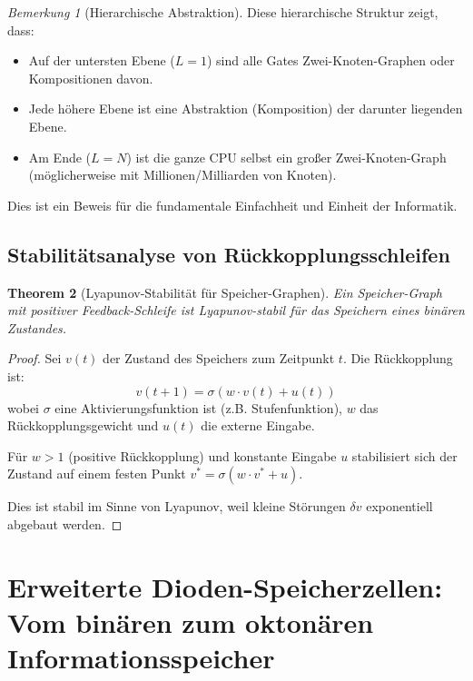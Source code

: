 \documentclass[12pt, a4paper]{article}
\newtheorem{theorem}{Theorem}[section]
\theoremstyle{definition}
\theoremstyle{remark}
\newtheorem{remark}[theorem]{Bemerkung}
\begin{document}
\begin{remark}[Hierarchische Abstraktion]
Diese hierarchische Struktur zeigt, dass:
\begin{itemize}
  \item Auf der untersten Ebene ($L=1$) sind alle Gates Zwei-Knoten-Graphen oder Kompositionen davon.
  \item Jede höhere Ebene ist eine Abstraktion (Komposition) der darunter liegenden Ebene.
  \item Am Ende ($L=N$) ist die ganze CPU selbst ein großer Zwei-Knoten-Graph (möglicherweise mit Millionen/Milliarden von Knoten).
\end{itemize}

Dies ist ein Beweis für die fundamentale Einfachheit und Einheit der Informatik.
\end{remark}

\subsection{Stabilitätsanalyse von Rückkopplungsschleifen}
\label{subsec:anhang_stabilitaet}

\begin{theorem}[Lyapunov-Stabilität für Speicher-Graphen]
\label{thm:anhang_lyapunov_speicher}
Ein Speicher-Graph mit positiver Feedback-Schleife ist Lyapunov-stabil für das Speichern eines binären Zustandes.
\end{theorem}

\begin{proof}
Sei $v(t)$ der Zustand des Speichers zum Zeitpunkt $t$. Die Rückkopplung ist:
\[
  v(t+1) = \sigma(w \cdot v(t) + u(t))
\]
wobei $\sigma$ eine Aktivierungsfunktion ist (z.B. Stufenfunktion), $w$ das Rückkopplungsgewicht und $u(t)$ die externe Eingabe.

Für $w > 1$ (positive Rückkopplung) und konstante Eingabe $u$ stabilisiert sich der Zustand auf einem festen Punkt $v^* = \sigma(w \cdot v^* + u)$.

Dies ist stabil im Sinne von Lyapunov, weil kleine Störungen $\delta v$ exponentiell abgebaut werden.
\end{proof}

\section{Erweiterte Dioden-Speicherzellen: Vom binären zum oktonären Informationsspeicher}
\label{sec:oktonaere_speicher}
\end{document}
